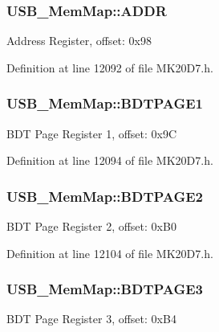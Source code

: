 \subsubsection[{\texorpdfstring{A\+D\+DR}{ADDR}}]{ U\+S\+B\+\_\+\+Mem\+Map\+::\+A\+D\+DR}\hypertarget{struct_u_s_b___mem_map_a6b1fac9acdf7f6c7e0471af3886c6a8e}{}\label{struct_u_s_b___mem_map_a6b1fac9acdf7f6c7e0471af3886c6a8e}
Address Register, offset\+: 0x98 

Definition at line 12092 of file M\+K20\+D7.\+h.

\subsubsection[{\texorpdfstring{B\+D\+T\+P\+A\+G\+E1}{BDTPAGE1}}]{ U\+S\+B\+\_\+\+Mem\+Map\+::\+B\+D\+T\+P\+A\+G\+E1}\hypertarget{struct_u_s_b___mem_map_ac61eff507f744f947ebf311e4d0a3767}{}\label{struct_u_s_b___mem_map_ac61eff507f744f947ebf311e4d0a3767}
B\+DT Page Register 1, offset\+: 0x9C 

Definition at line 12094 of file M\+K20\+D7.\+h.

\subsubsection[{\texorpdfstring{B\+D\+T\+P\+A\+G\+E2}{BDTPAGE2}}]{ U\+S\+B\+\_\+\+Mem\+Map\+::\+B\+D\+T\+P\+A\+G\+E2}\hypertarget{struct_u_s_b___mem_map_abb9113fced941f9af402d501dd6dc301}{}\label{struct_u_s_b___mem_map_abb9113fced941f9af402d501dd6dc301}
B\+DT Page Register 2, offset\+: 0x\+B0 

Definition at line 12104 of file M\+K20\+D7.\+h.

\subsubsection[{\texorpdfstring{B\+D\+T\+P\+A\+G\+E3}{BDTPAGE3}}]{ U\+S\+B\+\_\+\+Mem\+Map\+::\+B\+D\+T\+P\+A\+G\+E3}\hypertarget{struct_u_s_b___mem_map_afd1f5b8867e36b32297641c5fe0b283b}{}\label{struct_u_s_b___mem_map_afd1f5b8867e36b32297641c5fe0b283b}
B\+DT Page Register 3, offset\+: 0x\+B4 


